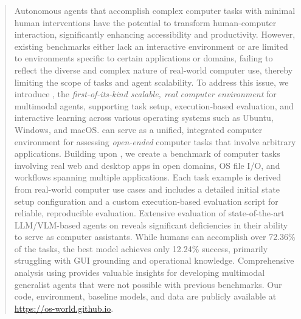\begin{abstract} 
Autonomous agents that accomplish complex computer tasks with minimal human interventions have the potential to transform human-computer interaction, significantly enhancing accessibility and productivity.
However, existing benchmarks either lack an interactive environment or are limited to environments specific to certain applications or domains, failing to reflect the diverse and complex nature of real-world computer use, thereby limiting the scope of tasks and agent scalability. 
To address this issue, we introduce \ours, the \textit{first-of-its-kind scalable, real computer environment} for multimodal agents, supporting task setup, execution-based evaluation, and interactive learning across various operating systems such as Ubuntu, Windows, and macOS.
\ours can serve as a unified, integrated computer environment for assessing \textit{open-ended} computer tasks that involve arbitrary applications.
Building upon \ours, we create a benchmark of \numexamples computer tasks involving real web and desktop apps in open domains, OS file I/O, and workflows spanning multiple applications.
Each task example is derived from real-world computer use cases and includes a detailed initial state setup configuration and a custom execution-based evaluation script for reliable, reproducible evaluation.
Extensive evaluation of state-of-the-art LLM/VLM-based agents on \ours reveals significant deficiencies in their ability to serve as computer assistants.
While humans can accomplish over 72.36\% of the tasks, the best model achieves only 12.24\% success, primarily struggling with GUI grounding and operational knowledge.
Comprehensive analysis using \ours provides valuable insights for developing multimodal generalist agents that were not possible with previous benchmarks.
Our code, environment, baseline models, and data are publicly available at \url{https://os-world.github.io}.

\end{abstract}
